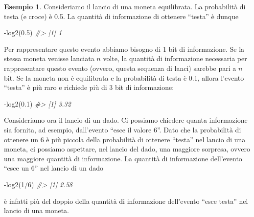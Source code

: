 \documentclass[
  10pt,
  italian,
  a4paper,
  extrafontsizes,onecolumn,openright
  ]{memoir}
\newenvironment{Shaded}{\begin{snugshade}}{\end{snugshade}}
\newcommand{\CommentTok}[1]{\textcolor[rgb]{0.56,0.35,0.01}{\textit{#1}}}
\newcommand{\DecValTok}[1]{\textcolor[rgb]{0.00,0.00,0.81}{#1}}
\newcommand{\FloatTok}[1]{\textcolor[rgb]{0.00,0.00,0.81}{#1}}
\newcommand{\FunctionTok}[1]{\textcolor[rgb]{0.00,0.00,0.00}{#1}}
\newcommand{\NormalTok}[1]{#1}
\newcommand{\SpecialCharTok}[1]{\textcolor[rgb]{0.00,0.00,0.00}{#1}}
\theoremstyle{definition}
\theoremstyle{definition}
\newtheorem{example}{Esempio}[chapter]
\theoremstyle{definition}
\theoremstyle{definition}
\theoremstyle{remark}
\begin{document}
\begin{example}
Consideriamo il lancio di una moneta equilibrata. La probabilità di testa (e croce) è 0.5. La quantità di informazione di ottenere ``testa'' è dunque

\begin{Shaded}
\begin{Highlighting}[]
\SpecialCharTok{{-}}\FunctionTok{log2}\NormalTok{(}\FloatTok{0.5}\NormalTok{)}
\CommentTok{\#\textgreater{} [1] 1}
\end{Highlighting}
\end{Shaded}

Per rappresentare questo evento abbiamo bisogno di 1 bit di informazione. Se la stessa moneta venisse lanciata \(n\) volte, la quantità di informazione necessaria per rappresentare questo evento (ovvero, questa sequenza di lanci) sarebbe pari a \(n\) bit. Se la moneta non è equilibrata e la probabilità di testa è 0.1, allora l'evento ``testa'' è più raro e richiede più di 3 bit di informazione:

\begin{Shaded}
\begin{Highlighting}[]
\SpecialCharTok{{-}}\FunctionTok{log2}\NormalTok{(}\FloatTok{0.1}\NormalTok{)}
\CommentTok{\#\textgreater{} [1] 3.32}
\end{Highlighting}
\end{Shaded}

Consideriamo ora il lancio di un dado. Ci possiamo chiedere quanta informazione sia fornita, ad esempio, dall'evento ``esce il valore 6''. Dato che la probabilità di ottenere un 6 è più piccola della probabilità di ottenere ``testa'' nel lancio di una moneta, ci possiamo aspettare, nel lancio del dado, una maggiore sorpresa, ovvero una maggiore quantità di informazione. La quantità di informazione dell'evento ``esce un 6'' nel lancio di un dado

\begin{Shaded}
\begin{Highlighting}[]
\SpecialCharTok{{-}}\FunctionTok{log2}\NormalTok{(}\DecValTok{1}\SpecialCharTok{/}\DecValTok{6}\NormalTok{)}
\CommentTok{\#\textgreater{} [1] 2.58}
\end{Highlighting}
\end{Shaded}

\noindent
è infatti più del doppio della quantità di informazione dell'evento ``esce testa'' nel lancio di una moneta.
\end{example}
\end{document}
